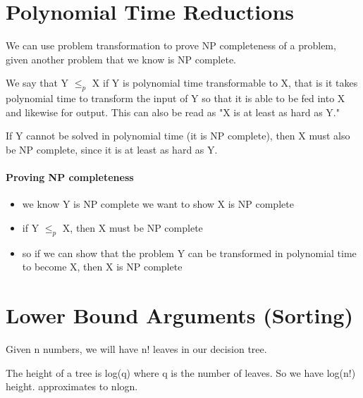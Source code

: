 \section{Polynomial Time Reductions}
We can use problem transformation to prove NP completeness of a problem, given another problem that we know is NP complete.
 
We say that Y $\leq_p$ X if Y is polynomial time transformable to X, that is it takes polynomial time to transform the input of Y so that it is able to be fed into X and likewise for output. This can also be read as "X is at least as hard as Y."
 
If Y cannot be solved in polynomial time (it is NP complete), then X must also be NP complete, since it is at least as hard as Y.

\paragraph{Proving NP completeness}
\begin{itemize}
    \item we know Y is NP complete
    we want to show X is NP complete
    \item if Y $\leq_p$ X, then X must be NP complete
    \item so if we can show that the problem Y can be transformed in polynomial time to become X, then X is NP complete
    
\end{itemize}


\section{Lower Bound Arguments (Sorting)}

Given n numbers, we will have n! leaves in our decision tree.
 
The height of a tree is log(q) where q is the number of leaves.
So we have log(n!) height. approximates to nlogn.

